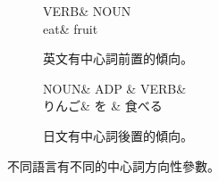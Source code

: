 \begin{figure}[tbp]
    \centering
    \begin{subfigure}[b]{1.\textwidth}
      \centering
      \captionsetup{justification=centering}
      \begin{dependency}[edge style={black!60!black,very thick},
        label style={fill=yellow!60,font=\bfseries,thick}]
        \begin{deptext}[column sep=0.3cm, row sep=0.5ex, font=\rmfamily]
          VERB\& NOUN \\
          eat\&  fruit \\
        \end{deptext}
      \end{dependency}
      \caption{英文有中心詞前置的傾向。}
      \label{fig:en-dir-example}
    \end{subfigure}
    \vfill
    \begin{subfigure}[b]{1.\textwidth}
      \centering
      \begin{dependency}[edge style={black!60!black,very thick},
        label style={fill=yellow!60,font=\bfseries,thick}]
        \begin{deptext}[column sep=0.3cm, row sep=0.5ex, font=\rmfamily]
          NOUN\&  ADP \& VERB\&  \\
          りんご\&  を \& 食べる \\
        \end{deptext}
      \end{dependency}
      \caption{日文有中心詞後置的傾向。}
      \label{fig:ja-dir-example}
    \end{subfigure}
    \caption{不同語言有不同的中心詞方向性參數。}
    \label{fig:head-dir-example}
\end{figure}